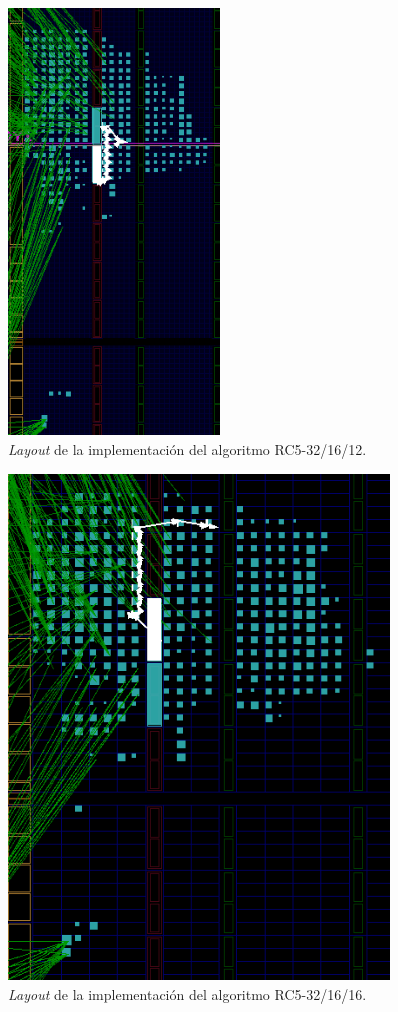 \begin{figure}[H]
	\centering
	\includegraphics[width=0.5\textwidth]{./images/fig32_16_12_layout}
	\caption{\textit{Layout} de la implementación del algoritmo RC5-32/16/12.}
	\label{fig32_16_12_layout}
\end{figure}


\begin{figure}[H]
	\centering
	\includegraphics[width=0.9\textwidth]{./images/fig32_16_16_layout}
	\caption{\textit{Layout} de la implementación del algoritmo RC5-32/16/16.}
	\label{fig32_16_16_layout}
\end{figure}